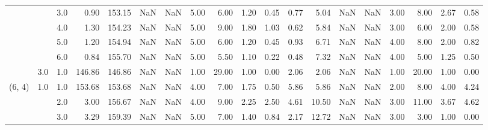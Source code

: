 \begin{tabular}{lllrrrrrrrrrrrrrrrr}
       &     & 3.0  &      0.90 &     153.15 &               NaN &                NaN &  5.00 &   6.00 &             1.20 &                         0.45 &      0.77 &       5.04 &               NaN &                NaN &  3.00 &   8.00 &             2.67 &                         0.58 \\
       &     & 4.0  &      1.30 &     154.23 &               NaN &                NaN &  5.00 &   9.00 &             1.80 &                         1.03 &      0.62 &       5.84 &               NaN &                NaN &  3.00 &   6.00 &             2.00 &                         0.58 \\
       &     & 5.0  &      1.20 &     154.94 &               NaN &                NaN &  5.00 &   6.00 &             1.20 &                         0.45 &      0.93 &       6.71 &               NaN &                NaN &  4.00 &   8.00 &             2.00 &                         0.82 \\
       &     & 6.0  &      0.84 &     155.70 &               NaN &                NaN &  5.00 &   5.50 &             1.10 &                         0.22 &      0.48 &       7.32 &               NaN &                NaN &  4.00 &   5.00 &             1.25 &                         0.50 \\
       & 3.0 & 1.0  &    146.86 &     146.86 &               NaN &                NaN &  1.00 &  29.00 &             1.00 &                         0.00 &      2.06 &       2.06 &               NaN &                NaN &  1.00 &  20.00 &             1.00 &                         0.00 \\
(6, 4) & 1.0 & 1.0  &    153.68 &     153.68 &               NaN &                NaN &  4.00 &   7.00 &             1.75 &                         0.50 &      5.86 &       5.86 &               NaN &                NaN &  2.00 &   8.00 &             4.00 &                         4.24 \\
       &     & 2.0  &      3.00 &     156.67 &               NaN &                NaN &  4.00 &   9.00 &             2.25 &                         2.50 &      4.61 &      10.50 &               NaN &                NaN &  3.00 &  11.00 &             3.67 &                         4.62 \\
       &     & 3.0  &      3.29 &     159.39 &               NaN &                NaN &  5.00 &   7.00 &             1.40 &                         0.84 &      2.17 &      12.72 &               NaN &                NaN &  3.00 &   3.00 &             1.00 &                         0.00 \\

\end{tabular}
